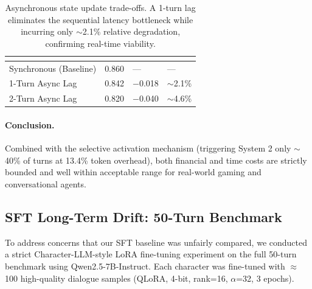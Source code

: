 \documentclass[11pt]{article}
\begin{document}
\begin{CJK*}{UTF8}{gbsn}
\begin{table}[h]
\centering
\small
\setlength{\tabcolsep}{4pt}
\renewcommand{\arraystretch}{1.12}
\begin{tabular}{L{0.38\columnwidth}C{0.14\columnwidth}C{0.16\columnwidth}C{0.16\columnwidth}}
\toprule
\textbf{} & \textbf{} & \textbf{} & \textbf{} \\
\midrule
Synchronous (Baseline) & 0.860 & --- & --- \\
1-Turn Async Lag & 0.842 & $-$0.018 & $\sim$2.1\% \\
2-Turn Async Lag & 0.820 & $-$0.040 & $\sim$4.6\% \\
\bottomrule
\end{tabular}
\caption{Asynchronous state update trade-offs. A 1-turn lag eliminates the sequential latency bottleneck while incurring only $\sim$2.1\% relative degradation, confirming real-time viability.}
\label{tab:async_state}
\end{table}

\paragraph{Conclusion.} Combined with the selective activation mechanism (triggering System 2 only $\sim$40\% of turns at 13.4\% token overhead), both financial and time costs are strictly bounded and well within acceptable range for real-world gaming and conversational agents.

\subsection{SFT Long-Term Drift: 50-Turn Benchmark}
\label{sec:sft_longterm}

To address concerns that our SFT baseline was unfairly compared, we conducted a strict Character-LLM-style LoRA fine-tuning experiment on the full 50-turn benchmark using Qwen2.5-7B-Instruct. Each character was fine-tuned with $\approx$100 high-quality dialogue samples (QLoRA, 4-bit, rank=16, $\alpha$=32, 3 epochs).


\end{CJK*}
\end{document}
